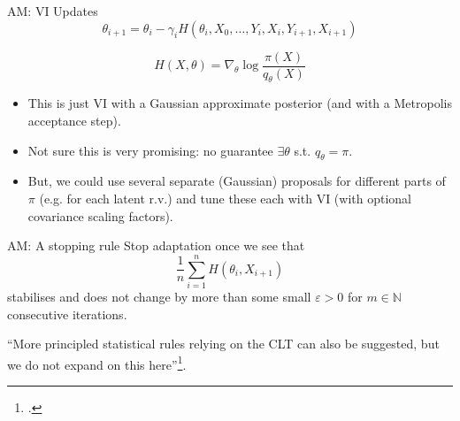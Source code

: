 \documentclass[aspectratio=169]{beamer}
\let\oldfootnote\footnote
\renewcommand{\footnote}{\only<+->\oldfootnote}
\begin{document}
\begin{frame}{AM: VI Updates}
    $$\theta_{i+1} = \theta_i - \gamma_i H(\theta_i, X_0, \ldots, Y_i, X_i, Y_{i+1}, X_{i+1})$$
    

    

        $$H(X, \theta) = \nabla_\theta \log \frac{\pi(X)}{q_\theta(X)}$$ 

    \begin{itemize}[<+->]
        \item This is just VI with a Gaussian approximate posterior (and with a Metropolis acceptance step).
        \item Not sure this is very promising: no guarantee $\exists \theta$ s.t. $q_\theta = \pi$.
        \item But, we could use several separate (Gaussian) proposals for different parts of $\pi$ (e.g. for each latent r.v.) and tune these each with VI (with optional covariance scaling factors).
    \end{itemize}
    
\end{frame}

\begin{frame}{AM: A stopping rule}
    Stop adaptation once we see that 
    $$\frac{1}{n} \sum_{i=1}^n H(\theta_i, X_{i+1})$$
    stabilises and does not change by more than some small $\varepsilon > 0$ for $m \in \mathbb{N}$ consecutive iterations.

    \pause 
    \vspace{1em}

    ``More principled statistical rules relying on the CLT can also be suggested, but we do not expand on this here''\footcite{andrieu_tutorial_2008}.
\end{frame}
\end{document}
